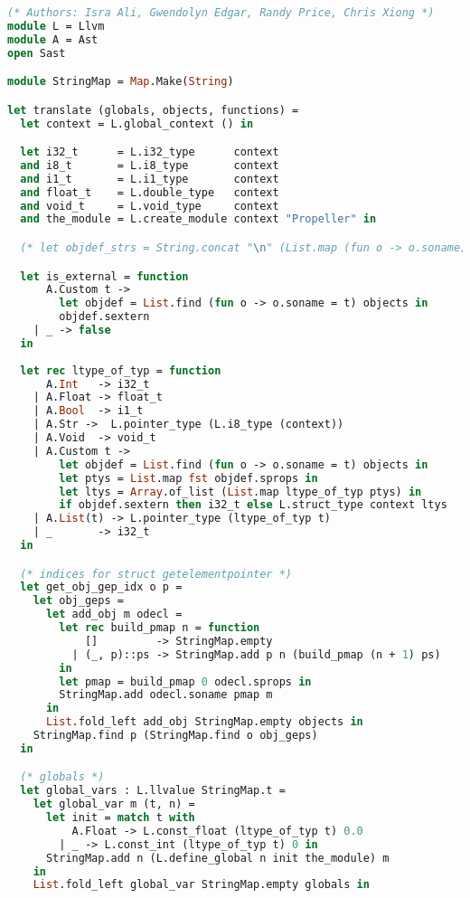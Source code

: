\begin{lstlisting}[language=Caml,backgroundcolor=\color{backgroundcolor}]
(* Authors: Isra Ali, Gwendolyn Edgar, Randy Price, Chris Xiong *)
module L = Llvm
module A = Ast
open Sast

module StringMap = Map.Make(String)

let translate (globals, objects, functions) =
  let context = L.global_context () in

  let i32_t      = L.i32_type      context
  and i8_t       = L.i8_type       context
  and i1_t       = L.i1_type       context
  and float_t    = L.double_type   context
  and void_t     = L.void_type     context
  and the_module = L.create_module context "Propeller" in

  (* let objdef_strs = String.concat "\n" (List.map (fun o -> o.soname) objects) in *)

  let is_external = function
      A.Custom t ->
        let objdef = List.find (fun o -> o.soname = t) objects in
        objdef.sextern
    | _ -> false
  in
  
  let rec ltype_of_typ = function
      A.Int   -> i32_t
    | A.Float -> float_t
    | A.Bool  -> i1_t
    | A.Str ->  L.pointer_type (L.i8_type (context)) 
    | A.Void  -> void_t
    | A.Custom t ->
        let objdef = List.find (fun o -> o.soname = t) objects in
        let ptys = List.map fst objdef.sprops in
        let ltys = Array.of_list (List.map ltype_of_typ ptys) in
        if objdef.sextern then i32_t else L.struct_type context ltys
    | A.List(t) -> L.pointer_type (ltype_of_typ t)
    | _       -> i32_t
  in

  (* indices for struct getelementpointer *)
  let get_obj_gep_idx o p =
    let obj_geps = 
      let add_obj m odecl =
        let rec build_pmap n = function
            []         -> StringMap.empty
          | (_, p)::ps -> StringMap.add p n (build_pmap (n + 1) ps)
        in
        let pmap = build_pmap 0 odecl.sprops in
        StringMap.add odecl.soname pmap m
      in
      List.fold_left add_obj StringMap.empty objects in
    StringMap.find p (StringMap.find o obj_geps)
  in

  (* globals *)
  let global_vars : L.llvalue StringMap.t =
    let global_var m (t, n) = 
      let init = match t with
          A.Float -> L.const_float (ltype_of_typ t) 0.0
        | _ -> L.const_int (ltype_of_typ t) 0 in
      StringMap.add n (L.define_global n init the_module) m
    in
    List.fold_left global_var StringMap.empty globals in


\end{lstlisting}
